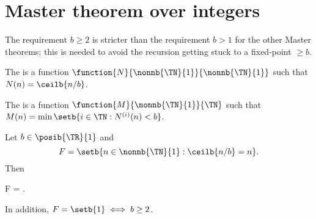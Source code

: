 \documentclass[b5paper, english, oneside]{memoir}
\begin{document}
\section{Master theorem over integers}

\ReMasterFunctionOverIntegers

\begin{note}
The requirement $b \geq 2$ is stricter than the requirement $b > 1$ for the other Master theorems; this is needed to avoid the recursion getting stuck to a fixed-point $\geq b$. 
\end{note}

\begin{definition}
The  is a function  $\function{N}{\nonnb{\TN}{1}}{\nonnb{\TN}{1}}$ such that $N(n) = \ceilb{n / b}$. 
\end{definition}

\begin{definition}
The  is a function $\function{M}{\nonnb{\TN}{1}}{\TN}$ such that $M(n) = \min\setb{i \in \TN : N^{(i)}(n) < b}$.
\end{definition}

\begin{theorem}
\label{FixedPointsOfCeilingDivision}
Let $b \in \posib{\TR}{1}$ and
\begin{equation}
F = \setb{n \in \nonnb{\TN}{1} : \ceilb{n / b} = n}.
\end{equation}
Then
\begin{eqs}
F = .
\end{eqs}
In addition, $F = \setb{1} \iff b \geq 2$.
\end{theorem}
\end{document}
